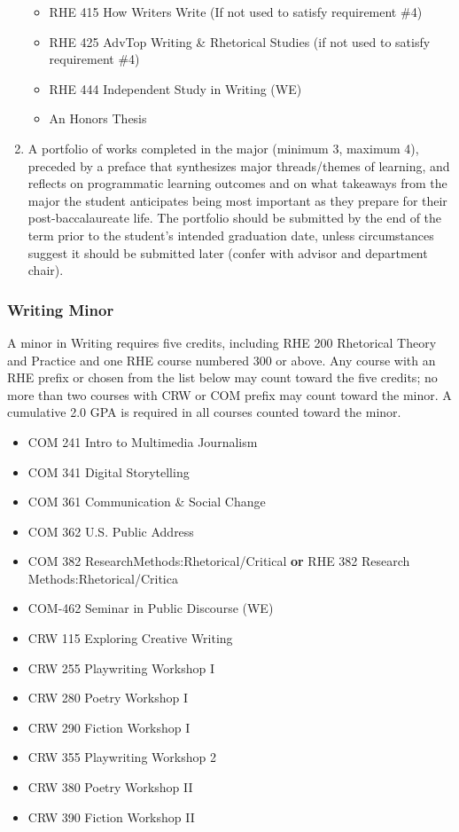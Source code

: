 \documentclass[
  letterpaper,
]{scrbook}
\providecommand{\tightlist}{%
  \setlength{\itemsep}{0pt}\setlength{\parskip}{0pt}}
\begin{document}
\begin{enumerate}
  \begin{itemize}
  \tightlist
  \item
    RHE 415 How Writers Write (If not used to satisfy requirement \#4)
  \item
    RHE 425 AdvTop Writing \& Rhetorical Studies (if not used to satisfy
    requirement \#4)
  \item
    RHE 444 Independent Study in Writing (WE)
  \item
    An Honors Thesis
  \end{itemize}
\item
  A portfolio of works completed in the major (minimum 3, maximum 4),
  preceded by a preface that synthesizes major threads/themes of
  learning, and reflects on programmatic learning outcomes and on what
  takeaways from the major the student anticipates being most important
  as they prepare for their post-baccalaureate life. The portfolio
  should be submitted by the end of the term prior to the student's
  intended graduation date, unless circumstances suggest it should be
  submitted later (confer with advisor and department chair).
\end{enumerate}

\subsubsection{Writing Minor}\label{writing-minor}

A minor in Writing requires five credits, including RHE 200 Rhetorical
Theory and Practice and one RHE course numbered 300 or above. Any course
with an RHE prefix or chosen from the list below may count toward the
five credits; no more than two courses with CRW or COM prefix may count
toward the minor. A cumulative 2.0 GPA is required in all courses
counted toward the minor.

\begin{itemize}
\tightlist
\item
  COM 241 Intro to Multimedia Journalism
\item
  COM 341 Digital Storytelling
\item
  COM 361 Communication \& Social Change
\item
  COM 362 U.S. Public Address
\item
  COM 382 ResearchMethods:Rhetorical/Critical \textbf{or} RHE 382
  Research Methods:Rhetorical/Critica
\item
  COM-462 Seminar in Public Discourse (WE)
\item
  CRW 115 Exploring Creative Writing
\item
  CRW 255 Playwriting Workshop I
\item
  CRW 280 Poetry Workshop I
\item
  CRW 290 Fiction Workshop I
\item
  CRW 355 Playwriting Workshop 2
\item
  CRW 380 Poetry Workshop II
\item
  CRW 390 Fiction Workshop II
\end{itemize}
\end{document}
